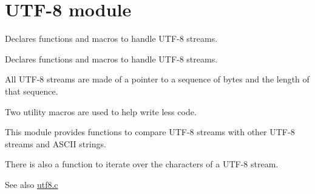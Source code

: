 \hypertarget{group__utf8}{}\section{U\+T\+F-\/8 module}
\label{group__utf8}


Declares functions and macros to handle U\+T\+F-\/8 streams.  


Declares functions and macros to handle U\+T\+F-\/8 streams. 

All U\+T\+F-\/8 streams are made of a pointer to a sequence of bytes and the length of that sequence.

Two utility macros are used to help write less code.

This module provides functions to compare U\+T\+F-\/8 streams with other U\+T\+F-\/8 streams and A\+S\+C\+II strings.

There is also a function to iterate over the characters of a U\+T\+F-\/8 stream.

\begin{DoxySeeAlso}{See also}
\hyperlink{utf8_8c}{utf8.\+c} 
\end{DoxySeeAlso}
